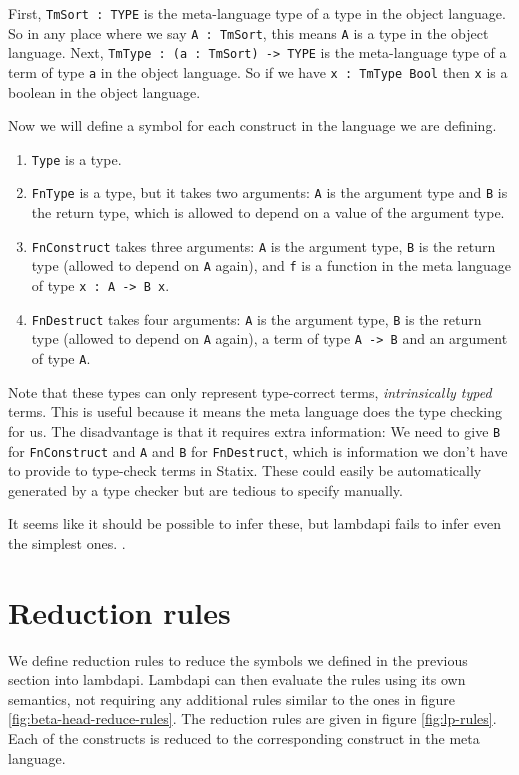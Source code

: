 First, \verb|TmSort : TYPE| is the meta-language type of a type in the object language. So in any place where we say \verb|A : TmSort|, this means \verb|A| is a type in the object language. Next, \verb|TmType : (a : TmSort) -> TYPE| is the meta-language type of a term of type \verb|a| in the object language. So if we have \verb|x : TmType Bool| then \verb|x| is a boolean in the object language. 

Now we will define a symbol for each construct in the language we are defining.
\begin{enumerate}
	\item \verb|Type| is a type.
	\item \verb|FnType| is a type, but it takes two arguments: \verb|A| is the argument type and \verb|B| is the return type, which is allowed to depend on a value of the argument type.
	\item \verb|FnConstruct| takes three arguments: \verb|A| is the argument type, \verb|B| is the return type (allowed to depend on \verb|A| again), and \verb|f| is a function in the meta language of type \verb|x : A -> B x|.
	\item \verb|FnDestruct| takes four arguments: \verb|A| is the argument type, \verb|B| is the return type (allowed to depend on \verb|A| again), a term of type \verb|A -> B| and an argument of type \verb|A|. 
\end{enumerate}

Note that these types can only represent type-correct terms, \emph{intrinsically typed} terms. This is useful because it means the meta language does the type checking for us. The disadvantage is that it requires extra information: We need to give \verb|B| for \verb|FnConstruct| and \verb|A| and \verb|B| for \verb|FnDestruct|, which is information we don't have to provide to type-check terms in Statix. These could easily be automatically generated by a type checker but are tedious to specify manually. 

It seems like it should be possible to infer these, but lambdapi fails to infer even the simplest ones. .

\section{Reduction rules}

We define reduction rules to reduce the symbols we defined in the previous section into lambdapi. Lambdapi can then evaluate the rules using its own semantics, not requiring any additional rules similar to the ones in figure \ref{fig:beta-head-reduce-rules}. The reduction rules are given in figure \ref{fig:lp-rules}. Each of the constructs is reduced to the corresponding construct in the meta language.

